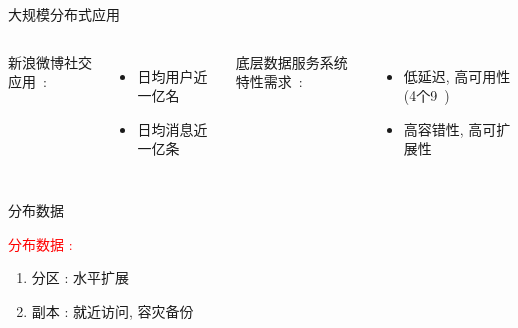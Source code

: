 \begin{frame}{大规模分布式应用}
  \vspace{0.50cm}

  \begin{columns}
	新浪微博社交应用~\footnotemark:
	\begin{itemize}
	  \item 日均用户近一亿名
	  \item 日均消息近一亿条
	\end{itemize}
	\pause
	底层数据服务系统特性需求~: 
	\begin{itemize}
	  \item 低延迟, 高可用性 (4个9~\footnotemark)
	  \item 高容错性, 高可扩展性
	\end{itemize}
  \end{columns}
  
\end{frame}
\begin{frame}{分布数据}
  \graphicspath{{tikz/}}
  \begin{figure}[h!]
    \centering
    \begin{adjustbox}{max totalsize = {0.50\textwidth}{1.00\textheight}, center}
      
    \end{adjustbox}
  \end{figure}

  \textcolor{red}{分布数据 :}
  \begin{enumerate}
	\item<2-> 分区 : 水平扩展
	\item<3-> 副本 : 就近访问, 容灾备份
  \end{enumerate}
\end{frame}
% 
